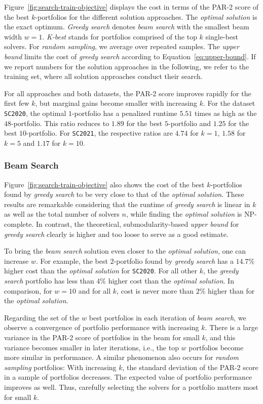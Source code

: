 \documentclass[runningheads]{llncs}
\begin{document}
Figure~\ref{fig:search-train-objective} displays the cost in terms of the PAR-2 score of the best $k$-portfolios for the different solution approaches. 
The \emph{optimal solution} is the exact optimum.
\emph{Greedy search} denotes \emph{beam search} with the smallest beam width $w=1$. 
\emph{K-best} stands for portfolios comprised of the top $k$ single-best solvers. 
For \emph{random sampling}, we average over repeated samples.
The \emph{upper bound} limits the cost of \emph{greedy search} according to Equation~\ref{eq:upper-bound}.
If we report numbers for the solution approaches in the following, we refer to the training set, where all solution approaches conduct their search.

For all approaches and both datasets, the PAR-2 score improves rapidly for the first few $k$, but marginal gains become smaller with increasing $k$.
For the dataset \texttt{SC2020}, the optimal $1$-portfolio has a penalized runtime $5.51$ times as high as the $48$-portfolio.
This ratio reduces to $1.89$ for the best $5$-portfolio and $1.25$ for the best $10$-portfolio.
For \texttt{SC2021}, the respective ratios are $4.74$ for $k=1$, $1.58$ for $k=5$ and $1.17$ for $k=10$.

\subsubsection{Beam Search}

Figure~\ref{fig:search-train-objective} also shows the cost of the best $k$-portfolios found by \emph{greedy search} to be very close to that of the \emph{optimal solution}.
These results are remarkable considering that the runtime of \emph{greedy search} is linear in $k$ as well as the total number of solvers $n$, while finding the \emph{optimal solution} is NP-complete.
In contrast, the theoretical, submodularity-based \emph{upper bound} for \emph{greedy search} clearly is higher and too loose to serve as a good estimate.

To bring the \emph{beam search} solution even closer to the \emph{optimal solution}, one can increase $w$.
For example, the best $2$-portfolio found by \emph{greedy search} has a $14.7\%$ higher cost than the \emph{optimal solution} for \texttt{SC2020}.
For all other $k$, the \emph{greedy search} portfolio has less than $4\%$ higher cost than the \emph{optimal solution}.
In comparison, for $w=10$ and for all $k$, cost is never more than $2\%$ higher than for the \emph{optimal solution}.

Regarding the set of the $w$ best portfolios in each iteration of \emph{beam search}, we observe a convergence of portfolio performance with increasing $k$. 
There is a large variance in the PAR-2 score of portfolios in the beam for small $k$, and this variance becomes smaller in later iterations, i.e., the top $w$ portfolios become more similar in performance.
A similar phenomenon also occurs for \emph{random sampling} portfolios:
With increasing $k$, the standard deviation of the PAR-2 score in a sample of portfolios decreases.
The expected value of portfolio performance improves as well.
Thus, carefully selecting the solvers for a portfolio matters most for small $k$.
\end{document}
